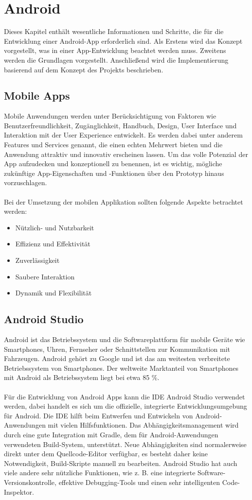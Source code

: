 \section{Android}
Dieses Kapitel enthält wesentliche Informationen und Schritte, die für die Entwicklung einer Android-App erforderlich sind.
Als Erstens wird das Konzept vorgestellt, was in einer App-Entwicklung beachtet werden muss. Zweitens werden die Grundlagen vorgestellt.
Anschließend wird die Implementierung basierend auf dem Konzept des Projekts beschrieben.
\subsection{Mobile Apps}
Mobile Anwendungen werden unter Berücksichtigung von Faktoren wie Benutzerfreundlichkeit, Zugänglichkeit, Handbuch, Design, User Interface und Interaktion mit der User Experience entwickelt.
Es werden dabei unter anderem Features und Services genannt, die einen echten Mehrwert bieten und die Anwendung attraktiv und innovativ erscheinen lassen.
Um das volle Potenzial der App aufzudecken und konzeptionell zu benennen, ist es wichtig, mögliche zukünftige App-Eigenschaften und -Funktionen über den Prototyp hinaus vorzuschlagen.\\\\
Bei der Umsetzung der mobilen Applikation sollten folgende Aspekte betrachtet werden:
\begin{itemize}
	\item Nützlich- und Nutzbarkeit
	\item Effizienz und Effektivität
	\item Zuverlässigkeit
	\item Saubere Interaktion
	\item Dynamik und Flexibilität
\end{itemize}


\subsection{Android Studio}
Android ist das Betriebssystem und die Softwareplattform für mobile Geräte wie Smartphones, Uhren, Fernseher oder Schnittstellen zur Kommunikation mit Fahrzeugen.
Android gehört zu Google und ist das am weitesten verbreitete Betriebssystem von Smartphones.
Der weltweite Marktanteil von Smartphones mit Android als Betriebssystem liegt bei etwa 85 \%.\\\\
Für die Entwicklung von Android Apps kann die IDE Android Studio verwendet werden, dabei  handelt es  sich um die offizielle, integrierte Entwicklungsumgebung für Android. Die IDE hilft beim Entwerfen und Entwickeln von Android-Anwendungen mit vielen Hilfsfunktionen. Das Abhängigkeitsmanagement wird durch eine gute Integration mit Gradle, dem für Android-Anwendungen verwendeten Build-System, unterstützt. Neue Abhängigkeiten sind normalerweise direkt unter dem  Quellcode-Editor verfügbar, es besteht daher  keine Notwendigkeit, Build-Skripte manuell zu bearbeiten.
Android Studio hat auch viele andere sehr nützliche Funktionen,  wie z. B. eine integrierte Software-Versionskontrolle, effektive Debugging-Tools und einen sehr intelligenten Code-Inspektor\cite{AndSt}.
